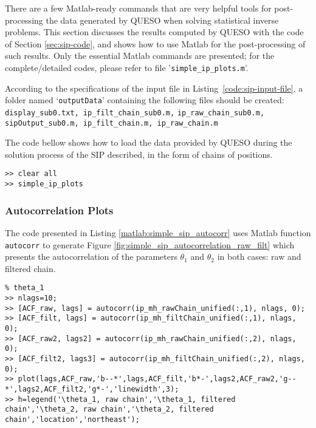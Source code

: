 There are a few Matlab-ready commands that are very helpful tools for post-processing the data generated by QUESO when solving statistical inverse problems. This section discusses the results computed by QUESO with the code of Section \ref{sec:sip-code}, and shows how to use Matlab for the post-processing of such results. Only the essential Matlab commands are presented; for the complete/detailed codes, please refer to file '\verb+simple_ip_plots.m+'.

According to the specifications of the input file in Listing~\ref{code:sip-input-file}, a folder named `\verb+outputData+' containing the following files should be created: \verb+display_sub0.txt, ip_filt_chain_sub0.m,+ \verb+ip_raw_chain_sub0.m, sipOutput_sub0.m, ip_filt_chain.m, ip_raw_chain.m+


The code bellow shows how to load the data provided by QUESO during the solution process of the SIP described, in the form of 
chains of positions.

\begin{lstlisting}[caption={Matlab code for loading the data in both raw and filtered chains of the SIP, by calling the file \texttt{simple\_ip\_plots.m}.}]
% inside Matlab
>> clear all
>> simple_ip_plots
\end{lstlisting}


\subsubsection{Autocorrelation Plots}

The code presented in Listing \ref{matlab:simple_sip_autocorr} uses Matlab function \verb+autocorr+ to generate Figure \ref{fig:simple_sip_autocorrelation_raw_filt}
which presents the autocorrelation of the parameters $\theta_1$ and $\theta_2$ in both cases: raw and filtered chain. 

\begin{lstlisting}[label=matlab:simple_sip_autocorr,caption={Matlab code for the autocorrelation plots depicted in Figure \ref{fig:simple_sip_autocorrelation_raw_filt}.}]
% inside Matlab
% theta_1
>> nlags=10;
>> [ACF_raw, lags] = autocorr(ip_mh_rawChain_unified(:,1), nlags, 0);
>> [ACF_filt, lags] = autocorr(ip_mh_filtChain_unified(:,1), nlags, 0);
>> [ACF_raw2, lags2] = autocorr(ip_mh_rawChain_unified(:,2), nlags, 0);
>> [ACF_filt2, lags3] = autocorr(ip_mh_filtChain_unified(:,2), nlags, 0);
>> plot(lags,ACF_raw,'b--*',lags,ACF_filt,'b*-',lags2,ACF_raw2,'g--*',lags2,ACF_filt2,'g*-','linewidth',3);
>> h=legend('\theta_1, raw chain','\theta_1, filtered chain','\theta_2, raw chain','\theta_2, filtered chain','location','northeast');
\end{lstlisting}

